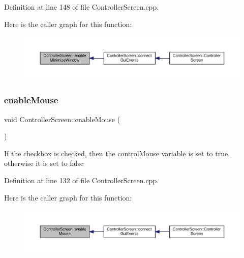 Definition at line 148 of file Controller\+Screen.\+cpp.

Here is the caller graph for this function\+:
\nopagebreak
\begin{figure}[H]
\begin{center}
\leavevmode
\includegraphics[width=350pt]{class_controller_screen_ad27b95368191153fa12d05091728b022_icgraph}
\end{center}
\end{figure}
\mbox{\label{class_controller_screen_a27681be09b97984576a895ad21343b65}} 
\subsubsection{\texorpdfstring{enable\+Mouse}{enableMouse}}
{\footnotesize\ttfamily void Controller\+Screen\+::enable\+Mouse (\begin{DoxyParamCaption}{ }\end{DoxyParamCaption})\hspace{0.3cm}{\ttfamily [slot]}}

If the checkbox is checked, then the control\+Mouse variable is set to true, otherwise it is set to false 

Definition at line 132 of file Controller\+Screen.\+cpp.

Here is the caller graph for this function\+:
\nopagebreak
\begin{figure}[H]
\begin{center}
\leavevmode
\includegraphics[width=350pt]{class_controller_screen_a27681be09b97984576a895ad21343b65_icgraph}
\end{center}
\end{figure}
\mbox{\label{class_controller_screen_a90e6dcfb4a0dfb2e845890bba3f208f5}} 
